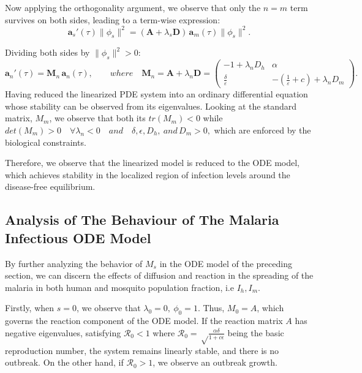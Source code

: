 \documentclass[12pt]{article}
\begin{document}
Now applying the orthogonality argument, we observe that only the $n = m$ term survives on both sides, leading to a term-wise expression:
\begin{equation}
\mathbf{a}_s'(\tau)\|\phi_s\|^2
= (\mathbf{A} + \lambda_s\mathbf{D})\,
\mathbf{a}_m(\tau)\|\phi_s\|^2.
\end{equation}

Dividing both sides by $\|\phi_s\|^2 > 0$:
\begin{equation}
\mathbf{a}_n'(\tau) 
= \mathbf{M}_n\,\mathbf{a}_n(\tau), 
\qquad where \quad 
\mathbf{M}_n = \mathbf{A} + \lambda_n\mathbf{D}
= \begin{pmatrix}
-1 + \lambda_n D_h & \alpha \\
\frac{\delta}{\varepsilon }& 
-(\frac{1}{\varepsilon} +c) + {\lambda_n D_m}
\end{pmatrix}.
\end{equation}
Having reduced the linearized PDE system into an ordinary differential equation whose stability can be observed from its eigenvalues. Looking at the standard matrix, $M_m$, we observe that both its $tr(M_m) < 0 $ while $det(M_m) > 0 \quad  \forall \lambda_n < 0 \quad and \quad \delta, \epsilon, D_h, \ and\,D_m > 0,$ which are enforced by the biological constraints.

Therefore, we observe that the linearized model is reduced to the ODE model, which achieves stability in the localized region of infection levels around the disease-free equilibrium.

\subsection{Analysis of The Behaviour of The Malaria Infectious ODE Model }

By further analyzing the behavior of $M_s$ in the ODE model of the preceding section, we can discern the effects of diffusion and reaction in the spreading of the malaria in both human and mosquito population fraction, i.e $I_h, I_m$. 

Firstly, when $s = 0$, we observe that $\lambda_0 = 0, \  \phi_0 = 1.$ Thus, $M_0 = A$, which governs the reaction component of the ODE model. If the reaction matrix $A$ has negative eigenvalues, satisfying $\mathcal{R}_0 < 1$ where $\mathcal{R}_0 = \sqrt\frac{\alpha\delta}{1+c\epsilon}$ being the basic reproduction number, the system remains linearly stable, and there is no outbreak.  On the other hand, if $\mathcal{R}_0 > 1$, we observe an outbreak growth.
\end{document}
